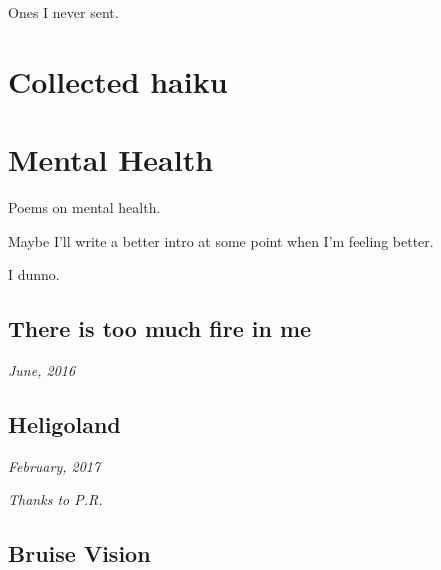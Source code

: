\documentclass[10pt]{memoir}
\begin{document}
  \vfill

  \hfill Ones I never sent.
  \thispagestyle{empty}
  \newpage


  


  \chapter{Collected haiku}
  \thispagestyle{empty}
  \newpage


  


  \chapter{Mental Health}

  Poems on mental health.

  \vfill

  \noindent Maybe I'll write a better intro at some point when I'm feeling better.

  \vfill

  \hfill I dunno.
  \thispagestyle{empty}
  \newpage


  \section{There is too much fire in me}

  \hfill\textit{June, 2016}

  
  \newpage


  \section{Heligoland}

  \hfill\textit{February, 2017}

  

  \textit{Thanks to P.R.}
  \newpage


  \section{Bruise Vision}
\end{document}
